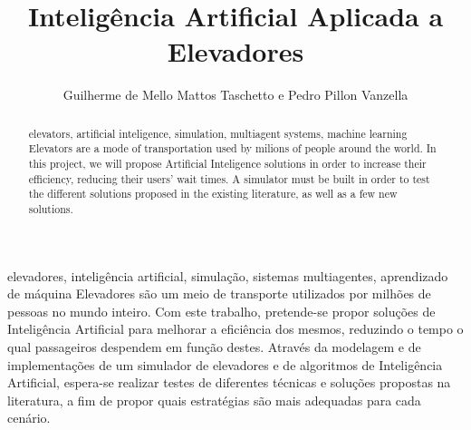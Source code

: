 \documentclass[portuguese,oneside]{tcc}
\author{Guilherme de Mello Mattos Taschetto e Pedro Pillon Vanzella}
\title{Inteligência Artificial Aplicada a Elevadores}
      {Artificial Intelligence Applied to Elevators}
\begin{document}
\begin{resumo}{elevadores, inteligência artificial, simulação, sistemas multiagentes, aprendizado de máquina}
Elevadores são um meio de transporte utilizados por milhões de pessoas no mundo
inteiro. Com este trabalho, pretende-se propor soluções de Inteligência
Artificial para melhorar a eficiência dos mesmos, reduzindo o tempo o qual
passageiros despendem em função destes. Através da modelagem e de implementações
de um simulador de elevadores e de algoritmos de Inteligência Artificial,
espera-se realizar testes de diferentes técnicas e soluções propostas na
literatura, a fim de propor quais estratégias são mais adequadas para cada
cenário.
\end{resumo}

\begin{abstract}{elevators, artificial inteligence, simulation, multiagent systems, machine learning}
  Elevators are a mode of transportation used by milions of people around the
  world. In this project, we will propose Artificial Inteligence solutions in
  order to increase their efficiency, reducing their users' wait times.
  A simulator must be built in order to test the different solutions proposed in
  the existing literature, as well as a few new solutions.
\end{abstract}

\tableofcontents










\end{document}
